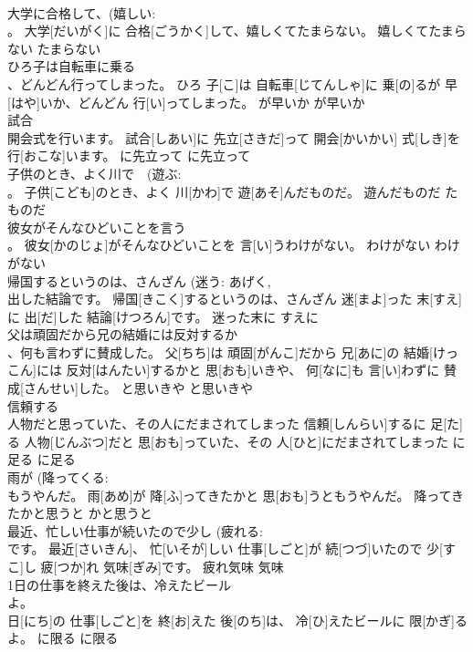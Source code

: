 \documentclass[8pt]{extreport}
\begin{document}
\begin{CJK}{UTF8}{min}
\\	大学に合格して、(嬉しい: 
\\	。	大学[だいがく]に 合格[ごうかく]して、嬉しくてたまらない。	嬉しくてたまらない	たまらない	
\\	ひろ子は自転車に乗る 
\\	、どんどん行ってしまった。	ひろ 子[こ]は 自転車[じてんしゃ]に 乗[の]るが 早[はや]いか、どんどん 行[い]ってしまった。	が早いか	が早いか	
\\	試合 
\\	開会式を行います。	試合[しあい]に 先立[さきだ]って 開会[かいかい] 式[しき]を 行[おこな]います。	に先立って	に先立って	
\\	子供のとき、よく川で　(遊ぶ: 
\\	。	子供[こども]のとき、よく 川[かわ]で 遊[あそ]んだものだ。	遊んだものだ	たものだ	
\\	彼女がそんなひどいことを言う 
\\	。	彼女[かのじょ]がそんなひどいことを 言[い]うわけがない。	わけがない	わけがない	
\\	帰国するというのは、さんざん (迷う: あげく, 
\\	出した結論です。	帰国[きこく]するというのは、さんざん 迷[まよ]った 末[すえ]に 出[だ]した 結論[けつろん]です。	迷った末に	すえに	
\\	父は頑固だから兄の結婚には反対するか 
\\	、何も言わずに賛成した。	父[ちち]は 頑固[がんこ]だから 兄[あに]の 結婚[けっこん]には 反対[はんたい]するかと 思[おも]いきや、 何[なに]も 言[い]わずに 賛成[さんせい]した。	と思いきや	と思いきや	
\\	信頼する 
\\	人物だと思っていた、その人にだまされてしまった	信頼[しんらい]するに 足[た]る 人物[じんぶつ]だと 思[おも]っていた、その 人[ひと]にだまされてしまった	に足る	に足る	
\\	雨が (降ってくる: 
\\	もうやんだ。	雨[あめ]が 降[ふ]ってきたかと 思[おも]うともうやんだ。	降ってきたかと思うと	かと思うと~	
\\	最近、忙しい仕事が続いたので少し (疲れる: 
\\	です。	最近[さいきん]、 忙[いそが]しい 仕事[しごと]が 続[つづ]いたので 少[すこ]し 疲[つか]れ 気味[ぎみ]です。	疲れ気味	気味	
\\	1日の仕事を終えた後は、冷えたビール 
\\	よ。	
\\	日[にち]の 仕事[しごと]を 終[お]えた 後[のち]は、 冷[ひ]えたビールに 限[かぎ]るよ。	に限る	に限る	

\end{CJK}
\end{document}
